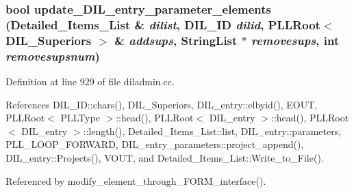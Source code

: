 \subsubsection{\setlength{\rightskip}{0pt plus 5cm}bool update\_\-DIL\_\-entry\_\-parameter\_\-elements ({\bf Detailed\_\-Items\_\-List} \& {\em dilist}, {\bf DIL\_\-ID} {\em dilid}, {\bf PLLRoot}$<$ DIL\_\-Superiors $>$ \& {\em addsups}, {\bf String\-List} $\ast$ {\em removesups}, int {\em removesupsnum})}\label{diladmin_8cc_a14}




Definition at line 929 of file diladmin.cc.

References DIL\_\-ID::chars(), DIL\_\-Superiors, DIL\_\-entry::elbyid(), EOUT, PLLRoot$<$ PLLType $>$::head(), PLLRoot$<$ DIL\_\-entry $>$::head(), PLLRoot$<$ DIL\_\-entry $>$::length(), Detailed\_\-Items\_\-List::list, DIL\_\-entry::parameters, PLL\_\-LOOP\_\-FORWARD, DIL\_\-entry\_\-parameters::project\_\-append(), DIL\_\-entry::Projects(), VOUT, and Detailed\_\-Items\_\-List::Write\_\-to\_\-File().

Referenced by modify\_\-element\_\-through\_\-FORM\_\-interface().



